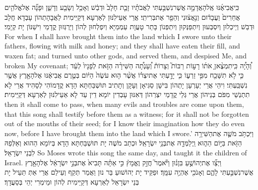 {כִּֽי\maqqaf אֲבִיאֶ֜נּוּ אֶֽל\maqqaf הָאֲדָמָ֣ה \legarmeh  אֲשֶׁר\maqqaf נִשְׁבַּ֣עְתִּי לַאֲבֹתָ֗יו זָבַ֤ת חָלָב֙ וּדְבַ֔שׁ וְאָכַ֥ל וְשָׂבַ֖ע וְדָשֵׁ֑ן וּפָנָ֞ה אֶל\maqqaf אֱלֹהִ֤ים אֲחֵרִים֙ וַעֲבָד֔וּם וְנִ֣אֲצ֔וּנִי וְהֵפֵ֖ר אֶת\maqqaf בְּרִיתִֽי׃}
{אֲרֵי אַעֵילִנּוּן לְאַרְעָא דְּקַיֵּימִית לַאֲבָהָתְהוֹן עָבְדָא חֲלָב וּדְבַשׁ וְיֵיכְלוּן וְיִסְבְּעוּן וְיִתְפַּנְּקוּן וְיִתְפְּנוֹן בָּתַר טָעֲוָת עַמְמַיָּא וְיִפְלְחוּן לְהוֹן וְיַרְגְּזוּן קֳדָמַי וִישַׁנּוֹן יָת קְיָמִי׃}
{For when I shall have brought them into the land which I swore unto their fathers, flowing with milk and honey; and they shall have eaten their fill, and waxen fat; and turned unto other gods, and served them, and despised Me, and broken My covenant;}{}
{וְ֠הָיָ֠ה כִּֽי\maqqaf תִמְצֶ֨אןָ אֹת֜וֹ רָע֣וֹת רַבּוֹת֮ וְצָרוֹת֒ וְ֠עָנְתָ֠ה הַשִּׁירָ֨ה הַזֹּ֤את לְפָנָיו֙ לְעֵ֔ד כִּ֛י לֹ֥א תִשָּׁכַ֖ח מִפִּ֣י זַרְע֑וֹ כִּ֧י יָדַ֣עְתִּי אֶת\maqqaf יִצְר֗וֹ אֲשֶׁ֨ר ה֤וּא עֹשֶׂה֙ הַיּ֔וֹם בְּטֶ֣רֶם אֲבִיאֶ֔נּוּ אֶל\maqqaf הָאָ֖רֶץ אֲשֶׁ֥ר נִשְׁבַּֽעְתִּי׃}
{וִיהֵי אֲרֵי יְעָרְעָן יָתְהוֹן בִּישָׁן סַגִּיאָן וְעָקָן וְתָתִיב תּוּשְׁבַּחְתָּא הָדָא קֳדָמוֹהִי לְסָהִיד אֲרֵי לָא תִתְנְשֵׁי מִפֹּם בְּנֵיהוֹן אֲרֵי גְּלֵי קֳדָמַי יִצְרְהוֹן דְּאִנּוּן עָבְדִין יוֹמָא דֵין עַד לָא אַעֵילִנּוּן לְאַרְעָא דְּקַיֵּימִית׃}
{then it shall come to pass, when many evils and troubles are come upon them, that this song shall testify before them as a witness; for it shall not be forgotten out of the mouths of their seed; for I know their imagination how they do even now, before I have brought them into the land which I swore.’}{}
{וַיִּכְתֹּ֥ב מֹשֶׁ֛ה אֶת\maqqaf הַשִּׁירָ֥ה הַזֹּ֖את בַּיּ֣וֹם הַה֑וּא וַֽיְלַמְּדָ֖הּ אֶת\maqqaf בְּנֵ֥י יִשְׂרָאֵֽל׃}
{וּכְתַב מֹשֶׁה יָת תּוּשְׁבַּחְתָּא הָדָא בְּיוֹמָא הַהוּא וְאַלְּפַהּ לִבְנֵי יִשְׂרָאֵל׃}
{So Moses wrote this song the same day, and taught it the children of Israel.}{}
{וַיְצַ֞ו אֶת\maqqaf יְהוֹשֻׁ֣עַ בִּן\maqqaf נ֗וּן וַיֹּ֘אמֶר֮ חֲזַ֣ק וֶאֱמָץ֒ כִּ֣י אַתָּ֗ה תָּבִיא֙ אֶת\maqqaf בְּנֵ֣י יִשְׂרָאֵ֔ל אֶל\maqqaf הָאָ֖רֶץ אֲשֶׁר\maqqaf נִשְׁבַּ֣עְתִּי לָהֶ֑ם וְאָנֹכִ֖י אֶהְיֶ֥ה עִמָּֽךְ׃}
{וּפַקֵּיד יָת יְהוֹשׁוּעַ בַּר נוּן וַאֲמַר תְּקַף וְעֵילַם אֲרֵי אַתְּ תַּעֵיל יָת בְּנֵי יִשְׂרָאֵל לְאַרְעָא דְּקַיֵּימִית לְהוֹן וּמֵימְרִי יְהֵי בְּסַעֲדָךְ׃}
